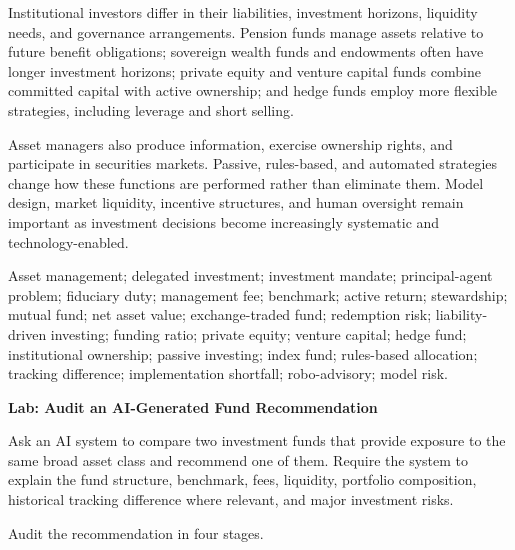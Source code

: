 Institutional investors differ in their liabilities,
investment horizons, liquidity needs, and governance
arrangements. Pension funds manage assets relative to future
benefit obligations; sovereign wealth funds and endowments
often have longer investment horizons; private equity and
venture capital funds combine committed capital with active
ownership; and hedge funds employ more flexible strategies,
including leverage and short selling.

Asset managers also produce information, exercise ownership
rights, and participate in securities markets. Passive,
rules-based, and automated strategies change how these
functions are performed rather than eliminate them. Model
design, market liquidity, incentive structures, and human
oversight remain important as investment decisions become
increasingly systematic and technology-enabled.



Asset management; delegated investment; investment mandate;
principal-agent problem; fiduciary duty; management fee;
benchmark; active return; stewardship; mutual fund;
net asset value; exchange-traded fund; redemption risk; liability-driven investing;
funding ratio; private equity; venture capital; hedge fund;
institutional ownership; passive investing; index fund;
rules-based allocation; tracking difference; 
implementation shortfall; robo-advisory;
model risk.



\textbf{Lab: Audit an AI-Generated Fund Recommendation}

Ask an AI system to compare two investment funds that provide exposure to the same broad asset class and recommend one of them. Require the system to explain the fund structure, benchmark, fees, liquidity, portfolio composition, historical tracking difference where relevant, and major investment risks.

Audit the recommendation in four stages.

